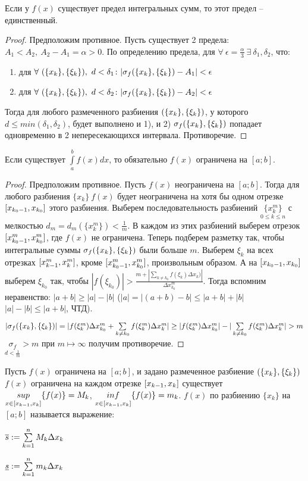 \begin{theor}
Если у $f(x)$ существует предел интегральных сумм, то этот предел -- единственный.
\end{theor}
\begin{proof}
Предположим противное. Пусть существует 2 предела: $A_1<A_2,\ A_2-A_1=\alpha>0$.
По определению предела, для $\forall\ \epsilon=\frac\alpha3\ \exists\ \delta_1,\delta_2$, что:
\begin{enumerate}
\item для $\forall\ \rr,\ d<\delta_1\colon|\sigma_f\rr-A_1|<\epsilon$
\item для $\forall\ \rr,\ d<\delta_2\colon|\sigma_f\rr-A_2|<\epsilon$
\end{enumerate}
Тогда для любого размеченного разбиения $(\{x_k\},\{\xi_k\})$, у которого $d\leq min(\delta_1,\delta_2)$, будет выполнено и 1), и 2) \then $\sigma_f(\{x_k\},\{\xi_k\})$ попадает одновременно в 2 непересекающихся интервала. Противоречие.
\end{proof}
\begin{theor}
Если существует $\int\limits_a^bf(x)dx$, то обязательно $f(x)$ ограничена на $[a;b]$.
\end{theor}
\begin{proof}
Предположим противное. Пусть $f(x)$ неограничена на $[a;b]$. Тогда для любого разбиения $\{x_k\}\ f(x)$ будет неограничена на хотя бы одном отрезке $[x_{k_0-1},x_{k_0}]$ этого разбиения. Выберем последовательность разбиений $\underset{0\leq k\leq n}{\{x_k^m\}}$ с мелкостью $d_m=d_m(\{x_k^m\})<\frac1m$. В каждом из этих разбиений выберем отрезок $[x^m_{k_0-1},x^m_{k_0}]$, где $f(x)$ не ограничена. Теперь подберем разметку так, чтобы интегральные суммы $\sigma_f(\{x_k\},\{\xi_k\})$ были больше $m$. Выберем $\xi_k$ на всех отрезках $[x^m_{k-1},x^m_k]$, кроме $[x^m_{k_0-1},x^m_{k_0}]$, произвольным образом. А на $[x_{k_0-1},x_{k_0}]$ выберем $\xi_{k_0}$ так, чтобы $|f(\xi_{k_0})|>\frac{m+|\sum\limits_{k\neq k_0}f(\xi_k)\Delta x_k)|}{\Delta x^m_{k_0}}$.
Тогда вспомним неравенство: $|a+b|\geq|a|-|b|$ ($|a|=|(a+b)-b|\leq|a+b|+|b|$ \then $|a|-|b|\leq|a+b|$, ЧТД).

$|\sigma_f\rr|=|f(\xi_k^m)\Delta x_{k_0}^m+\sum\limits_{k\neq k_0}f(\xi^m_k)\Delta x^m_k|\geq|f(\xi_k^m)\Delta x_{k_0}^m|-|\sum\limits_{k\neq k_0}f(\xi^m_k)\Delta x^m_k|>m$ \then $\underset{d<\frac1m}{\sigma_f}>m$ \then при $m\mapsto\infty$ получим противоречие.
\end{proof}
\begin{opred}
Пусть $f(x)$ ограничена на $[a;b]$, и задано размеченное разбиение $(\{x_k\},\{\xi_k\})$ \then $f(x)$ ограничена на каждом отрезке $[x_{k-1},x_k]$ \then  существует $\underset{x\in[x_{k-1},x_k]}{sup}\{f(x)\}=M_k$, $\underset{x\in[x_{k-1},x_k]}{inf}\{f(x)\}=m_k$.  $f(x)$ по разбиению $\{x_k\}$ на $[a;b]$  называется выражение:

$\overline{s}:=\sum\limits_{k=1}^nM_k\Delta x_k$

$\underline{s}:=\sum\limits_{k=1}^nm_k\Delta x_k$
\end{opred}
